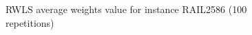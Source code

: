 \begin{figure}[H]
	\centering%
	\caption{RWLS average weights value for instance RAIL2586 (100 repetitions)}%
\end{figure}
